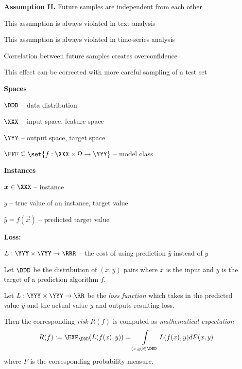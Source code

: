 \documentclass[landscape,footrule]{foils}
\begin{document}
\textbf{Assumption II.} Future samples are independent from each other
\begin{triangles}
\item This assumption is always violated in text analysis
\item This assumption is always violated in time-series analysis
\item Correlation between future samples creates overconfidence
\item This effect can be corrected with more careful sampling of a test set
\end{triangles}


\textbf{Spaces}
\begin{triangles}
\item $\DDD$ -- data distribution
\item $\XXX$ -- input space, feature space
\item $\YYY$ -- output space, target space
\item $\FFF\subseteq\set{f:\XXX\times\Omega\to\YYY}$ -- model class\vspace*{0.5cm}
\end{triangles}

\textbf{Instances}
\begin{triangles}
\item $\vec{x}\in\XXX$ -- instance
\item $y$ -- true value of an instance, target value
\item $\hat{y}=f(\vec{x})$ -- predicted target value\vspace*{0.5cm}
\end{triangles}

\textbf{Loss:}
\begin{triangles}
\item $L:\YYY\times\YYY\to\RRR$ --  the cost of using prediction $\hat{y}$ instead of $y$
\end{triangles}
 

Let $\DDD$ be the distribution of $(x,y)$ pairs where $x$ is the input and $y$ is the target of a prediction algorithm $f$. 
\bigskip

Let $L:\YYY\times\YYY\to\RR$ be the \emph{loss function} which takes in the predicted value $\hat{y}$ and the actual value $y$ and outputs resulting loss.
\bigskip

Then the corresponding \emph{risk} $R(f)$ is computed as \emph{mathematical expectation}
\begin{align*}
 R(f):=\EXP_\DDD(L(f(x), y))=\int\limits_{(x,y)\in\DDD} L(f(x), y) dF(x,y)
\end{align*}   
where $F$ is the corresponding probability measure.
\end{document}
